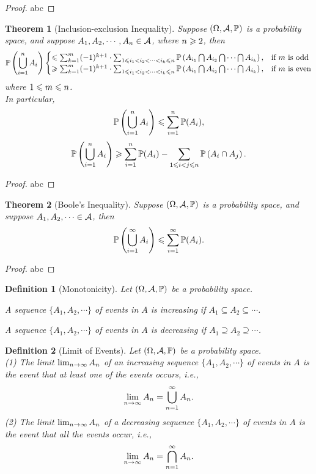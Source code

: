 \documentclass[openany,12pt]{book}
\newtheorem{theorem}{Theorem}[chapter]
\newtheorem{definition}{Definition}[chapter]
\begin{document}
\begin{proof}
  abc
\end{proof}

\begin{theorem}[Inclusion-exclusion Inequality]
  Suppose $(\Omega,\mathcal{A},\mathbb{P})$ is a probability space, and suppose $A_1,A_2, \cdots,A_n\in\mathcal{A}$, where $n\geqslant2$, then
  $$\mathbb{P}\left(\bigcup_{i=1}^n A_i \right)
    \begin{cases}
      \leqslant\sum_{k=1}^m(-1)^{k+1}\cdot  \sum_{1\leqslant i_1<i_2<\cdots<i_k\leqslant n}\mathbb{P}\left(A_{i_1} \bigcap A_{i_2 } \bigcap\cdots\bigcap A_{i_k } \right), & \text{if $m$ is odd}  \\
      \geqslant\sum_{k=1}^m(-1)^{k+1}\cdot  \sum_{1\leqslant i_1<i_2<\cdots<i_k\leqslant n}\mathbb{P}\left(A_{i_1} \bigcap A_{i_2 } \bigcap\cdots\bigcap A_{i_k } \right), & \text{if $m$ is even}
    \end{cases}
  $$
  where $1\leqslant m\leqslant n$.\\
  In particular,
  $$\mathbb{P}\left(\bigcup_{i=1}^n A_i \right)\leqslant\sum_{i=1}^{n} \mathbb{P}(A_i),$$
  $$\mathbb{P}\left(\bigcup_{i=1}^n A_i \right)\geqslant\sum_{i=1}^{n} \mathbb{P}(A_i)-
    \sum_{1\leqslant i<j\leqslant n}\mathbb{P}\left(A_i\cap A_j\right).$$
\end{theorem}

\begin{proof}
  abc
\end{proof}

\begin{theorem}[Boole's Inequality]
  Suppose $(\Omega,\mathcal{A},\mathbb{P})$ is a probability space, and suppose $A_1,A_2,\cdots\in\mathcal{A}$, then
  $$\mathbb{P}\left(\bigcup_{i=1}^\infty A_i \right)\leqslant\sum_{i=1}^\infty \mathbb{P}(A_i).$$
\end{theorem}

\begin{proof}
  abc
\end{proof}

\begin{definition}[Monotonicity]
  Let $(\Omega,\mathcal{A},\mathbb{P})$ be a probability space.

  A sequence $\{A_1,A_2,\cdots\}$ of events in $A$ is increasing if $A_1\subseteq A_2\subseteq\cdots$.

  A sequence $\{A_1,A_2,\cdots\}$ of events in $A$ is decreasing if $A_1\supseteq A_2\supseteq\cdots$.
\end{definition}

\begin{definition}[Limit of Events]
  Let $(\Omega,\mathcal{A},\mathbb{P})$ be a probability space.\\
  (1) The limit $\lim_{n\to\infty} A_n$ of an increasing sequence $\{A_1,A_2,\cdots\}$ of events in $A$ is the event that at least one of the events occurs, i.e., $$\lim_{n\to\infty} A_n=\bigcup_{n=1}^\infty A_n.$$
  (2) The limit $\lim_{n\to\infty} A_n$ of a decreasing sequence $\{A_1,A_2,\cdots\}$ of events in $A$ is the event that all the events occur, i.e., $$\lim_{n\to\infty} A_n=\bigcap_{n=1}^\infty A_n.$$
\end{definition}
\end{document}
